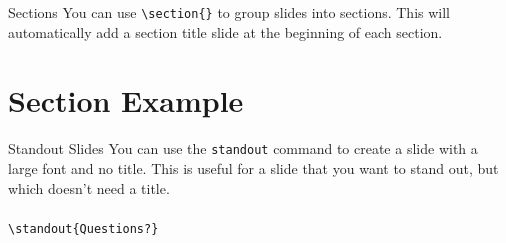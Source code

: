 \documentclass[aspectratio=1610]{beamer}
\begin{document}
\begin{frame}{Sections}
    You can use \texttt{\textbackslash section\{\}} to group slides into sections. This will automatically add a section title slide at the beginning of each section.
    
\end{frame}


\section{Section Example}



\begin{frame}{Standout Slides}
    You can use the \texttt{standout} command to create a slide with a large font and no title. This is useful for a slide that you want to stand out, but which doesn't need a title.
    \\ ~ \\
    \texttt{\textbackslash standout\{Questions?\}}

\end{frame}

\end{document}
